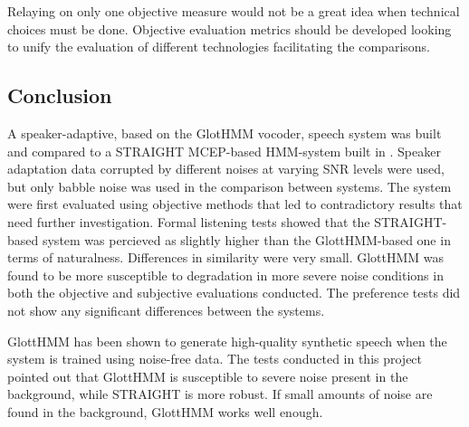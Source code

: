 Relaying on only one objective measure would not be a great idea when technical choices must be done.
%
Objective evaluation metrics should be developed looking to unify the evaluation of different technologies facilitating the comparisons.

\subsection{Conclusion}
\label{conclusions_conclusion}
A speaker-adaptive, based on the GlotHMM vocoder, speech system was built and compared to a STRAIGHT MCEP-based HMM-system built in \cite{karhila_jstsp_14}.
%
Speaker adaptation data corrupted by different noises at varying SNR levels were used, but only babble noise was used in the comparison between systems.
%
The system were first evaluated using objective methods that led to contradictory results that need further investigation.
%
Formal listening tests showed that the STRAIGHT-based system was percieved as slightly higher than the GlottHMM-based one in terms of naturalness.
%
Differences in similarity were very small.
%
GlottHMM was found to be more susceptible to degradation in more severe noise conditions in both the objective and subjective evaluations conducted.
%
The preference tests did not show any significant differences between the systems.

GlottHMM has been shown to generate high-quality synthetic speech when the system is trained using noise-free data.
%
The tests conducted in this project pointed out that GlottHMM is susceptible to severe noise present in the background, while STRAIGHT is more robust.
%
If small amounts of noise are found in the background, GlottHMM works well enough.